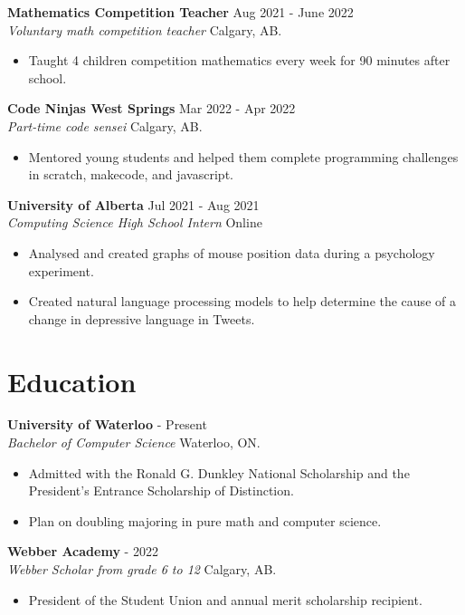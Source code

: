 \documentclass{article}
\newcommand{\moduleHeadF}[4]{
    \vspace{0.5em}
    \textbf{#1} \dotfill #2 \\[0.1em]
    \textit{#3} \hfill   #4 \\[0em]
}
\newcommand{\moduleHeadFA}[4]{
    \vspace{0.5em}
    \textbf{#1} \dotfill #2 \\[0.1em]
    \textit{#3} \hfill   #4 \\[-1em]
}
\newenvironment{compactList}
{
    \vspace{-2em}
    \begin{itemize}[itemsep=-5pt, label=$-$]
}
{
    \end{itemize}
    \vspace{-0.8em}
}
\begin{document}
\moduleHeadF{Mathematics Competition Teacher}{Aug 2021 - June 2022}{Voluntary math competition teacher}{Calgary, AB.}
\begin{compactList}
    \item Taught 4 children competition mathematics every week for 90 minutes after school.
\end{compactList}

\moduleHeadF{Code Ninjas West Springs}{Mar 2022 - Apr 2022}{Part-time code sensei}{Calgary, AB.}
\begin{compactList}
    \item Mentored young students and helped them complete programming challenges in scratch, makecode, and javascript.
\end{compactList}

\moduleHeadF{University of Alberta}{Jul 2021 - Aug 2021}{Computing Science High School Intern}{Online}
\begin{compactList}
    \item Analysed and created graphs of mouse position data during a psychology experiment.
    \item Created natural language processing models to help determine the cause of a change in depressive language in Tweets.
\end{compactList}


\section{Education}

\moduleHeadF{University of Waterloo}{2022 - Present}{Bachelor of Computer Science}{Waterloo, ON.}
\begin{compactList}
    \item Admitted with the Ronald G. Dunkley National Scholarship and the President's Entrance Scholarship of Distinction.
    \item Plan on doubling majoring in pure math and computer science.
\end{compactList}



\moduleHeadF{Webber Academy}{2008 - 2022}{Webber Scholar from grade 6 to 12}{Calgary, AB.}
\begin{compactList}
    \item President of the Student Union and annual merit scholarship recipient.
\end{compactList}


% 
\end{document}
